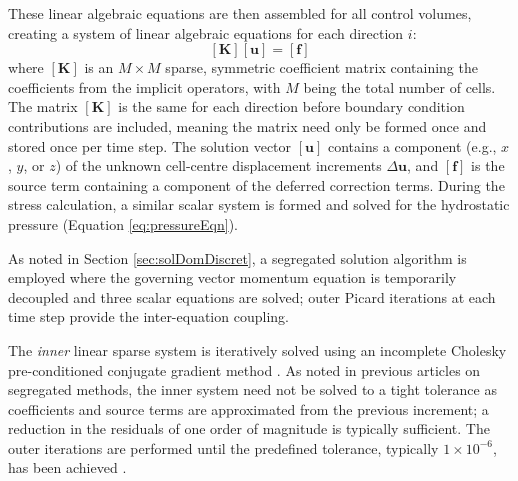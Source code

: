 \documentclass[sn-mathphys,Numbered]{sn-jnl}%
\newcommand{\bb}{\boldsymbol}
\begin{document}
These linear algebraic equations are then assembled for all control volumes, creating a system of linear algebraic equations for each direction $i$:
\begin{equation}
    \left[\bb{K}\right]
    \left[\bb{u}\right] =
    \left[ \bb{f} \right]
\end{equation}
where $\left[\bb{K}\right]$ is an $M \times M$ sparse, symmetric coefficient matrix containing the coefficients from the implicit operators, with $M$ being the total number of cells.
The matrix $\left[\bb{K}\right]$ is the same for each direction before boundary condition contributions are included, meaning the matrix need only be formed once and stored once per time step.
The solution vector $\left[\bb{u}\right]$ contains a component (e.g., $x$, $y$, or $z$) of the unknown cell-centre displacement increments $\Delta\bb{ u}$, and $\left[\bb{f}\right]$ is the source term containing a component of the deferred correction terms.
During the stress calculation, a similar scalar system is formed and solved for the hydrostatic pressure (Equation \ref{eq:pressureEqn}).

As noted in Section \ref{sec:solDomDiscret}, a segregated solution algorithm is employed where the governing vector momentum equation is temporarily decoupled and three scalar equations are solved; outer Picard iterations at each time step provide the inter-equation coupling.

The \emph{inner} linear sparse system is iteratively solved using an incomplete Cholesky pre-conditioned conjugate gradient method \cite{jacobs_generalization_1986}.
As noted in previous articles on segregated methods, the inner system need not be solved to a tight tolerance as coefficients and source terms are approximated from the previous increment; a reduction in the residuals of one order of magnitude is typically sufficient. The outer iterations are performed until the predefined tolerance, typically $1 \times 10^{-6}$, has been achieved \cite{cardiff_lagrangian_2017}. 
\end{document}
